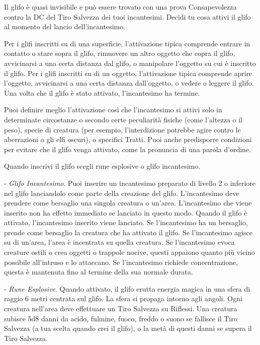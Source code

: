 \begin{multicols}{2}
Il glifo è quasi invisibile e può essere trovato con una prova Consapevolezza contro la DC del Tiro Salvezza dei tuoi incantesimi. Decidi tu cosa attivi il glifo al momento del lancio dell'incantesimo.

Per i glifi inscritti su di una superficie, l'attivazione tipica comprende entrare in contatto o stare sopra il glifo, rimuovere un altro oggetto che copra il glifo, avvicinarsi a una certa distanza dal glifo, o manipolare l'oggetto su cui è inscritto il glifo. Per i glifi inscritti su di un oggetto, l'attivazione tipica comprende aprire l'oggetto, avvicinarsi a una certa distanza dall'oggetto, o vedere o leggere il glifo. Una volta che il glifo è stato attivato, l'incantesimo ha termine.

Puoi definire meglio l'attivazione così che l'incantesimo si attivi solo in determinate circostanze o secondo certe peculiarità fisiche (come l'altezza o il peso), specie di creatura (per esempio, l'interdizione potrebbe agire contro le aberrazioni o gli elfi oscuri), o specifici Tratti. Puoi anche predisporre condizioni per evitare che il glifo venga attivato, come la pronuncia di una parola d'ordine.

Quando inscrivi il glifo scegli rune esplosive o glifo incantesimo.

\medskip

- \emph{Glifo Incantesimo}. Puoi inserire un incantesimo preparato di livello 2 o inferiore nel glifo lanciandolo come parte della creazione del glifo. L'incantesimo deve prendere come bersaglio una singola creatura o un'area. L'incantesimo che viene inserito non ha effetto immediato se lanciato in questo modo. Quando il glifo è attivato, l'incantesimo inserito viene lanciato. Se l'incantesimo ha un bersaglio, prende come bersaglio la creatura che ha attivato il glifo. Se l'incantesimo agisce su di un'area, l'area è incentrata su quella creatura. Se l'incantesimo evoca creature ostili o crea oggetti o trappole nocive, questi appaiono quanto più vicino possibile all'intruso e lo attaccano. Se l'incantesimo richiede concentrazione, questa è mantenuta fino al termine della sua normale durata.

- \emph{Rune Esplosive}. Quando attivato, il glifo erutta energia magica in una sfera di raggio 6 metri centrata sul glifo. La sfera si propaga intorno agli angoli. Ogni creatura nell'area deve effettuare un Tiro Salvezza su Riflessi. Una creatura subisce 5d8 danni da acido, fulmine, fuoco, freddo o suono se fallisce il Tiro Salvezza (a tua scelta quando crei il glifo), o la metà di questi danni se supera il Tiro Salvezza.


\end{multicols}
